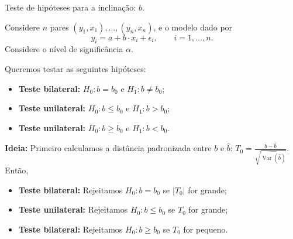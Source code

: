 \documentclass[8pt]{beamer}
\DeclareMathOperator{\vari}{Var}
\begin{document}
\begin{frame}{Teste de hipóteses para  a inclinação: $b$.}

Considere $n$ pares $(y_1, x_1), \dots, (y_n, x_n)$, e o modelo dado por
$$y_i = a + b \cdot x_i + \epsilon_i, \qquad i =1, \dots, n.$$
Considere o nível de significância $\alpha$.
\vfill

Queremos testar as seguintes hipóteses:
\begin{itemize}
	\item \textbf{Teste bilateral:} $H_0: b = b_0$ e $H_1: b \neq b_0$;
	\item \textbf{Teste unilateral:} $H_0: b \leq b_0$ e $H_1: b > b_0$;
	\item \textbf{Teste unilateral:} $H_0: b \geq b_0$ e $H_1: b < b_0$.
\end{itemize}
\vfill

\textbf{Ideia:} Primeiro calculamos a distância padronizada entre $b$ e $\hat{b}$: $T_0 = \frac{b - \hat{b}}{\sqrt{\widehat{\vari({\hat{b}})}}}$. Então,
\begin{itemize}
	\item \textbf{Teste bilateral:} Rejeitamos $H_0: b = b_0$ se $\lvert T_0 \rvert$ for grande;
	\item \textbf{Teste unilateral:} Rejeitamos $H_0: b \leq b_0$ se $ T_0 $ for grande;
	\item \textbf{Teste bilateral:} Rejeitamos $H_0: b \geq b_0$ se $T_0$ for pequeno.
\end{itemize}

\end{frame}
\end{document}
